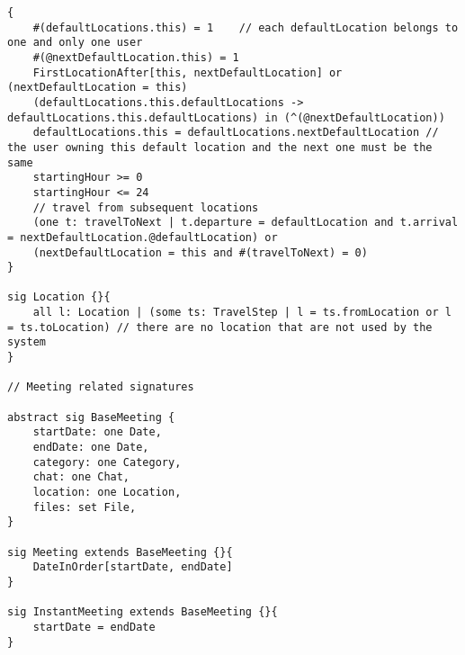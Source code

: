 \clearpage
\begin{lstlisting}[style=alloy]
{
	#(defaultLocations.this) = 1	// each defaultLocation belongs to one and only one user
	#(@nextDefaultLocation.this) = 1
	FirstLocationAfter[this, nextDefaultLocation] or (nextDefaultLocation = this)
	(defaultLocations.this.defaultLocations -> defaultLocations.this.defaultLocations) in (^(@nextDefaultLocation))
	defaultLocations.this = defaultLocations.nextDefaultLocation // the user owning this default location and the next one must be the same
	startingHour >= 0
	startingHour <= 24
	// travel from subsequent locations
	(one t: travelToNext | t.departure = defaultLocation and t.arrival = nextDefaultLocation.@defaultLocation) or 
	(nextDefaultLocation = this and #(travelToNext) = 0)
}

sig Location {}{
	all l: Location | (some ts: TravelStep | l = ts.fromLocation or l = ts.toLocation) // there are no location that are not used by the system
}

// Meeting related signatures

abstract sig BaseMeeting {
	startDate: one Date,
	endDate: one Date,
	category: one Category,
	chat: one Chat,
	location: one Location,
	files: set File,
}

sig Meeting extends BaseMeeting {}{
	DateInOrder[startDate, endDate]
}

sig InstantMeeting extends BaseMeeting {}{
	startDate = endDate
}

\end{lstlisting}
\clearpage
